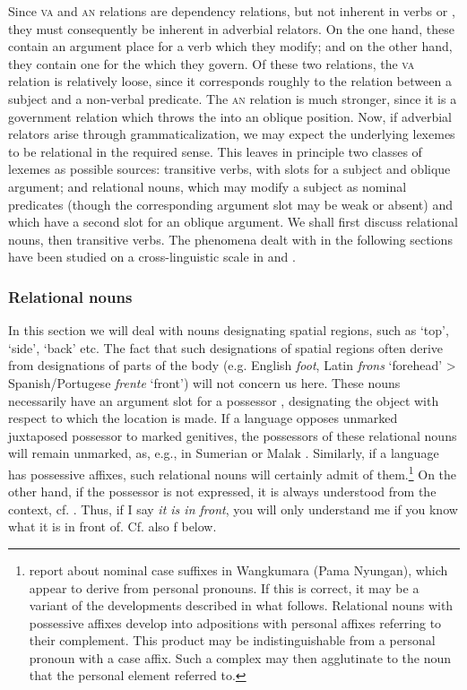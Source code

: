 Since \textsc{va} and \textsc{an} relations are dependency relations, but not inherent in verbs or \nps, they must consequently be inherent in adverbial relators. On the one hand, these contain an argument place for a verb which they modify; and on the other hand, they contain one for the \np which they govern. Of these two relations, the \textsc{va} relation is relatively loose, since it corresponds roughly to the relation between a subject and a non-verbal predicate. The \textsc{an} relation is much stronger, since it is a government relation which throws the \np into an oblique position. Now, if adverbial relators arise through grammaticalization, we may expect the underlying lexemes to be relational in the required sense. This leaves in principle two classes of lexemes as possible sources: transitive verbs, with slots for a subject and oblique argument; and relational nouns, which may modify a subject as nominal predicates (though the corresponding argument slot may be weak or absent) and which have a second slot for an oblique argument. We shall first discuss relational nouns, then transitive verbs. The phenomena dealt with in the following sections have been studied on a cross-linguistic scale in \citet{Kahr1975,Kahr1976} and \citet[esp.~240]{Austerlitz1980}.

\subsubsection{Relational nouns}
In this section we will deal with nouns designating spatial regions, such as ‘top’, ‘side’, ‘back’ etc. The fact that such designations of spatial regions often derive from designations of parts of the body (e.g. English \textit{foot}, Latin \textit{frons} ‘forehead’ {\textgreater} Spanish/Portugese \textit{frente} ‘front’) will not concern us here. These nouns necessarily have an argument slot for a possessor \np, designating the object with respect to which the location is made. If a language opposes unmarked juxtaposed possessor \nps to marked genitives, the possessors of these relational nouns will remain unmarked, as, e.g., in Sumerian or Malak \citep[389]{MallinsonEtAl1981}. Similarly, if a language has possessive affixes, such relational nouns will certainly admit of them.\footnote{\citet[50f]{MallinsonEtAl1981} report about nominal case suffixes in Wangkumara (Pama Nyungan), which appear to derive from personal pronouns. If this is correct, it may be a variant of the developments described in what follows. Relational nouns with possessive affixes develop into adpositions with personal affixes referring to their complement. This product may be indistinguishable from a personal pronoun with a case affix. Such a complex may then agglutinate to the noun that the personal element referred to.} On the other hand, if the possessor is not expressed, it is always understood from the context, cf. \citet[§5.2.3.1]{Seiler1983}. Thus, if I say \textit{it is in front}, you will only understand me if you know what it is in front of. Cf. also f below.

